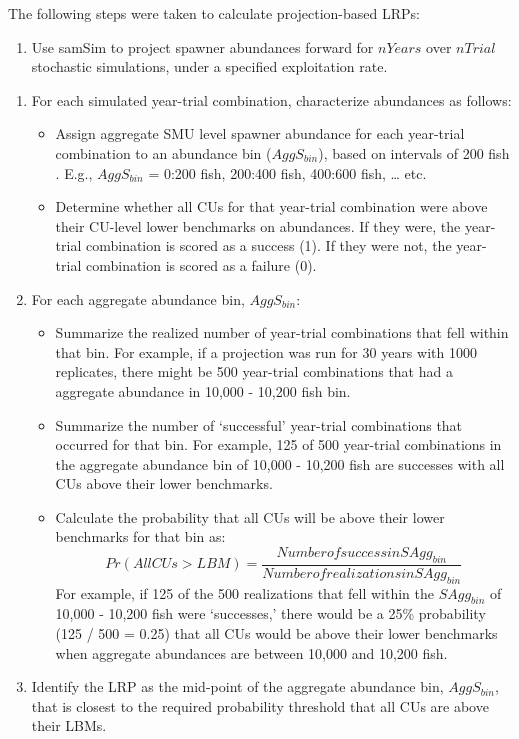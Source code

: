 \documentclass[11pt]{book}
\begin{document}
The following steps were taken to calculate projection-based LRPs:
\begin{enumerate}
\def\labelenumi{\arabic{enumi}.}

\item
  Use samSim to project spawner abundances forward for \(nYears\) over \(nTrial\) stochastic simulations, under a specified exploitation rate.
\end{enumerate}
\begin{enumerate}
\def\labelenumi{\arabic{enumi}.}
\setcounter{enumi}{1}
\item
  For each simulated year-trial combination, characterize abundances as follows:
  \begin{itemize}
  \item
    Assign aggregate SMU level spawner abundance for each year-trial combination to an abundance bin (\(AggS_{bin}\)), based on intervals of 200 fish . E.g., \(AggS_{bin}\) = 0:200 fish, 200:400 fish, 400:600 fish, \ldots{} etc.
  \item
    Determine whether all CUs for that year-trial combination were above their CU-level lower benchmarks on abundances. If they were, the year-trial combination is scored as a success (1). If they were not, the year-trial combination is scored as a failure (0).
  \end{itemize}
\item
  For each aggregate abundance bin, \(AggS_{bin}\):
  \begin{itemize}
  \item
    Summarize the realized number of year-trial combinations that fell within that bin. For example, if a projection was run for 30 years with 1000 replicates, there might be 500 year-trial combinations that had a aggregate abundance in 10,000 - 10,200 fish bin.
  \item
    Summarize the number of `successful' year-trial combinations that occurred for that bin. For example, 125 of 500 year-trial combinations in the aggregate abundance bin of 10,000 - 10,200 fish are successes with all CUs above their lower benchmarks.
  \item
    Calculate the probability that all CUs will be above their lower benchmarks for that bin as: \begin{equation}
     Pr(All CUs > LBM) = \frac{Number of success in SAgg_{bin}} {Number of realizations in SAgg_{bin}}
     \label{eq:projBins}
    \end{equation} For example, if 125 of the 500 realizations that fell within the \(SAgg_{bin}\) of 10,000 - 10,200 fish were `successes,' there would be a 25\% probability (125 / 500 = 0.25) that all CUs would be above their lower benchmarks when aggregate abundances are between 10,000 and 10,200 fish.
  \end{itemize}
\item
  Identify the LRP as the mid-point of the aggregate abundance bin, \(AggS_{bin}\), that is closest to the required probability threshold that all CUs are above their LBMs.
\end{enumerate}
\end{document}
